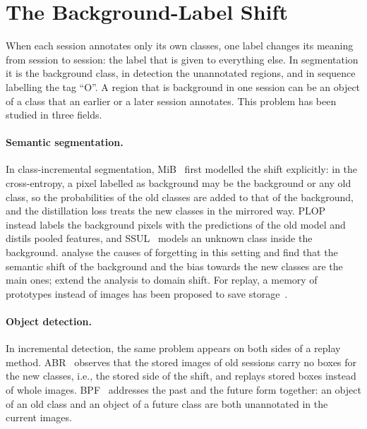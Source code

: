 \section{The Background-Label Shift}
\label{sec:c2-s3}

When each session annotates only its own classes, one label changes its meaning from
session to session: the label that is given to everything else. In segmentation it is the
background class, in detection the unannotated regions, and in sequence labelling the tag
``O''. A region that is background in one session can be an object of a class that an
earlier or a later session annotates. This problem has been studied in three fields.

\paragraph{Semantic segmentation.} In class-incremental segmentation,
MiB~\citep{cermelli2020mib} first modelled the shift explicitly: in the cross-entropy, a
pixel labelled as background may be the background or any old class, so the probabilities
of the old classes are added to that of the background, and the distillation loss treats
the new classes in the mirrored way. PLOP~\citep{douillard2021plop} instead labels the
background pixels with the predictions of the old model and distils pooled features, and
SSUL~\citep{cha2021ssul} models an unknown class inside the background.
\citet{kalb2022causes} analyse the causes of forgetting in this setting and find that the
semantic shift of the background and the bias towards the new classes are the main ones;
\citet{kalb2023principles} extend the analysis to domain shift. For replay, a memory of
prototypes instead of images has been proposed to save storage~\citep{chen2023star}.

\paragraph{Object detection.} In incremental detection, the same problem appears on both
sides of a replay method. ABR~\citep{liu2023abr} observes that the stored images of old
sessions carry no boxes for the new classes, i.e., the stored side of the shift, and
replays stored boxes instead of whole images. BPF~\citep{mo2024bpf} addresses the past and
the future form together: an object of an old class and an object of a future class are
both unannotated in the current images.

